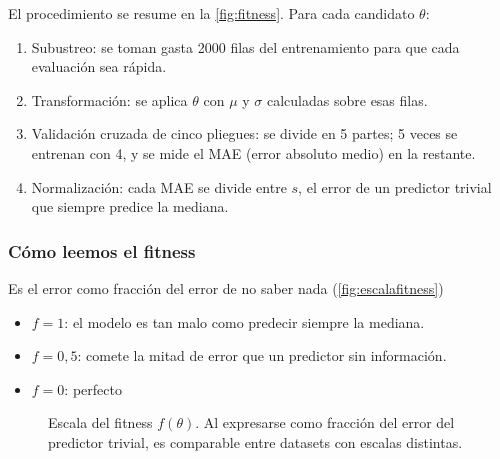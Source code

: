 El procedimiento se resume en la \autoref{fig:fitness}. Para cada candidato $\theta$: 
\begin{enumerate}
    \item Subustreo: se toman gasta 2000 filas del entrenamiento para que cada evaluación sea rápida. 
    \item Transformación: se aplica $\theta$ con $\mu$ y $\sigma$ calculadas sobre esas filas. 
    \item Validación cruzada de cinco pliegues: se divide en 5 partes; 5 veces se entrenan con 4, y se mide el MAE (error absoluto medio) en la restante. 
    \item Normalización: cada MAE se divide entre $s$, el error de un predictor trivial que siempre predice la mediana.
\end{enumerate}

\subsubsection{Cómo leemos el fitness}
Es el error como fracción del error de no saber nada (\autoref{fig:escalafitness})

\begin{itemize}
    \item $f=1$: el modelo es tan malo como predecir siempre la mediana. 
    \item $f=0,5$: comete la mitad de error que un predictor sin información. 
    \item $f=0$: perfecto
\end{itemize}

\begin{figure}[htbp]
\centering
{}
\caption{Escala del fitness $f(\theta)$. Al expresarse como fracción del error
del predictor trivial, es comparable entre datasets con escalas distintas.}
\label{fig:escalafitness}
\end{figure}


